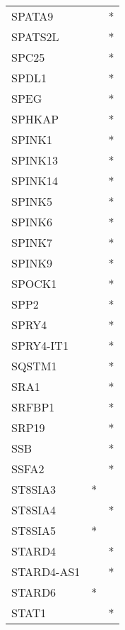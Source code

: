\begin{longtable}{lcc}
SPATA9          &                &          * \\
SPATS2L         &                &          * \\
SPC25           &                &          * \\
SPDL1           &                &          * \\
SPEG            &                &          * \\
SPHKAP          &                &          * \\
SPINK1          &                &          * \\
SPINK13         &                &          * \\
SPINK14         &                &          * \\
SPINK5          &                &          * \\
SPINK6          &                &          * \\
SPINK7          &                &          * \\
SPINK9          &                &          * \\
SPOCK1          &                &          * \\
SPP2            &                &          * \\
SPRY4           &                &          * \\
SPRY4-IT1       &                &          * \\
SQSTM1          &                &          * \\
SRA1            &                &          * \\
SRFBP1          &                &          * \\
SRP19           &                &          * \\
SSB             &                &          * \\
SSFA2           &                &          * \\
ST8SIA3         &              * &            \\
ST8SIA4         &                &          * \\
ST8SIA5         &              * &            \\
STARD4          &                &          * \\
STARD4-AS1      &                &          * \\
STARD6          &              * &            \\
STAT1           &                &          * \\

\end{longtable}
